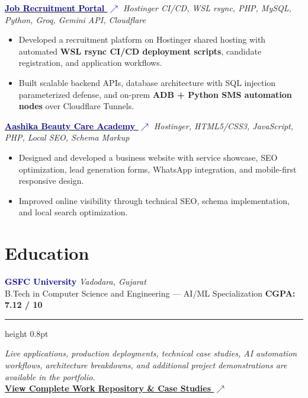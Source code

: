 \documentclass[10.5pt]{article}
\newcommand{\faExternalLink}{$\nearrow$}
\begin{document}
\vspace{2pt}

\noindent\href{https://jobrecruitment.in/}{\textbf{\textcolor{darkblue}{Job Recruitment Portal \faExternalLink}}} \hfill \textit{\small\color{medgray}Hostinger CI/CD, WSL rsync, PHP, MySQL, Python, Groq, Gemini API, Cloudflare}
\begin{itemize}
\item Developed a recruitment platform on Hostinger shared hosting with automated \textbf{WSL rsync CI/CD deployment scripts}, candidate registration, and application workflows.
\item Built scalable backend APIs, database architecture with SQL injection parameterized defense, and on-prem \textbf{ADB + Python SMS automation nodes} over Cloudflare Tunnels.
\end{itemize}

\vspace{2pt}

\noindent\href{https://aashikabeautycareacademylasercenter.com/}{\textbf{\textcolor{darkblue}{Aashika Beauty Care Academy \faExternalLink}}} \hfill \textit{\small\color{medgray}Hostinger, HTML5/CSS3, JavaScript, PHP, Local SEO, Schema Markup}
\begin{itemize}
\item Designed and developed a business website with service showcase, SEO optimization, lead generation forms, WhatsApp integration, and mobile-first responsive design.
\item Improved online visibility through technical SEO, schema implementation, and local search optimization.
\end{itemize}

\section*{Education}
\noindent\textbf{\textcolor{darkblue}{GSFC University}} \hfill \textit{\small\color{medgray}Vadodara, Gujarat}\\
{\small B.Tech in Computer Science and Engineering --- AI/ML Specialization \hfill \textbf{CGPA: 7.12 / 10}}

\vspace{6pt}
{\color{borderblue}\hrule height 0.8pt}
\vspace{4pt}
\begin{center}
\small\textit{
Live applications, production deployments, technical case studies,
AI automation workflows, architecture breakdowns, and additional
project demonstrations are available in the portfolio.
} \\[3pt]
\href{https://hemalshah.vercel.app/wr.html}{\textcolor{accentblue}{\textbf{View Complete Work Repository \& Case Studies \faExternalLink}}}
\end{center}
\end{document}
